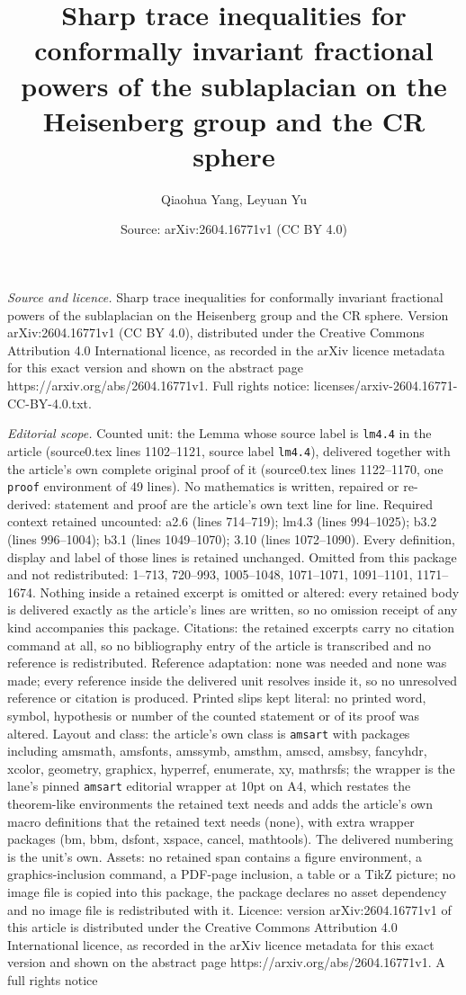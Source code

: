 \documentclass[10pt,a4paper]{amsart}
\title[Sharp trace inequalities for conformally invariant fractiona]{Sharp trace inequalities for conformally invariant fractional powers of the sublaplacian on the Heisenberg group and the CR sphere}
\author{Qiaohua Yang, Leyuan Yu}
\date{Source: arXiv:2604.16771v1 (CC BY 4.0)}
\begin{document}
\maketitle

\noindent\emph{Source and licence.} Sharp trace inequalities for conformally invariant fractional powers of the sublaplacian on the Heisenberg group and the CR sphere. Version arXiv:2604.16771v1 (CC BY 4.0), distributed under the Creative Commons Attribution 4.0 International licence, as recorded in the arXiv licence metadata for this exact version and shown on the abstract page https://arxiv.org/abs/2604.16771v1. Full rights notice: licenses/arxiv-2604.16771-CC-BY-4.0.txt.\par\smallskip

\noindent\textit{Editorial scope.} Counted unit: the Lemma whose source label is \texttt{lm4.4} in the article (source0.tex lines 1102--1121, source label \texttt{lm4.4}), delivered together with the article's own complete original proof of it (source0.tex lines 1122--1170, one \texttt{proof} environment of 49 lines). No mathematics is written, repaired or re-derived: statement and proof are the article's own text line for line. Required context retained uncounted: a2.6 (lines 714--719); lm4.3 (lines 994--1025); b3.2 (lines 996--1004); b3.1 (lines 1049--1070); 3.10 (lines 1072--1090). Every definition, display and label of those lines is retained unchanged. Omitted from this package and not redistributed: 1--713, 720--993, 1005--1048, 1071--1071, 1091--1101, 1171--1674. Nothing inside a retained excerpt is omitted or altered: every retained body is delivered exactly as the article's lines are written, so no omission receipt of any kind accompanies this package. Citations: the retained excerpts carry no citation command at all, so no bibliography entry of the article is transcribed and no reference is redistributed. Reference adaptation: none was needed and none was made; every reference inside the delivered unit resolves inside it, so no unresolved reference or citation is produced. Printed slips kept literal: no printed word, symbol, hypothesis or number of the counted statement or of its proof was altered. Layout and class: the article's own class is \texttt{amsart} with packages including amsmath, amsfonts, amssymb, amsthm, amscd, amsbsy, fancyhdr, xcolor, geometry, graphicx, hyperref, enumerate, xy, mathrsfs; the wrapper is the lane's pinned \texttt{amsart} editorial wrapper at 10pt on A4, which restates the theorem-like environments the retained text needs and adds the article's own macro definitions that the retained text needs (none), with extra wrapper packages (bm, bbm, dsfont, xspace, cancel, mathtools). The delivered numbering is the unit's own. Assets: no retained span contains a figure environment, a graphics-inclusion command, a PDF-page inclusion, a table or a TikZ picture; no image file is copied into this package, the package declares no asset dependency and no image file is redistributed with it. Licence: version arXiv:2604.16771v1 of this article is distributed under the Creative Commons Attribution 4.0 International licence, as recorded in the arXiv licence metadata for this exact version and shown on the abstract page https://arxiv.org/abs/2604.16771v1. A full rights notice 
\end{document}
